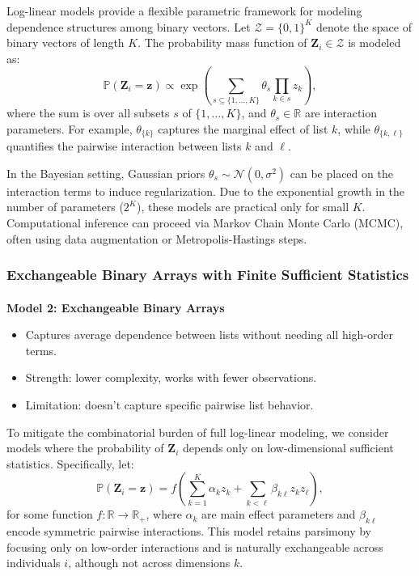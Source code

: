 \documentclass[
  12pt,
]{article}
\makeatletter
\let\oldparagraph\paragraph
\renewcommand{\paragraph}{
    \@ifstar
      \xxxParagraphStar
      \xxxParagraphNoStar
  }
\newcommand{\xxxParagraphStar}[1]{\oldparagraph*{#1}\mbox{}}
\newcommand{\xxxParagraphNoStar}[1]{\oldparagraph{#1}\mbox{}}
\providecommand{\tightlist}{%
  \setlength{\itemsep}{0pt}\setlength{\parskip}{0pt}}\usepackage{longtable,booktabs,array}
\theoremstyle{plain}
\theoremstyle{definition}
\makeatother
\begin{document}
Log-linear models provide a flexible parametric framework for modeling
dependence structures among binary vectors. Let
\(\mathcal{Z} = \{0,1\}^K\) denote the space of binary vectors of length
\(K\). The probability mass function of \(\mathbf{Z}_i \in \mathcal{Z}\)
is modeled as: \[
\mathbb{P}(\mathbf{Z}_i = \mathbf{z}) \propto \exp\left( \sum_{s \subseteq \{1, \ldots, K\}} \theta_s \prod_{k \in s} z_k \right),
\] where the sum is over all subsets \(s\) of \(\{1, \ldots, K\}\), and
\(\theta_s \in \mathbb{R}\) are interaction parameters. For example,
\(\theta_{\{k\}}\) captures the marginal effect of list \(k\), while
\(\theta_{\{k,\ell\}}\) quantifies the pairwise interaction between
lists \(k\) and \(\ell\).

In the Bayesian setting, Gaussian priors
\(\theta_s \sim \mathcal{N}(0, \sigma^2)\) can be placed on the
interaction terms to induce regularization. Due to the exponential
growth in the number of parameters (\(2^K\)), these models are practical
only for small \(K\). Computational inference can proceed via Markov
Chain Monte Carlo (MCMC), often using data augmentation or
Metropolis-Hastings steps.

\subsubsection{Exchangeable Binary Arrays with Finite Sufficient
Statistics}\label{exchangeable-binary-arrays-with-finite-sufficient-statistics}

\paragraph{\texorpdfstring{\textbf{Model 2: Exchangeable Binary
Arrays}}{Model 2: Exchangeable Binary Arrays}}\label{model-2-exchangeable-binary-arrays}

\begin{itemize}
\tightlist
\item
  Captures average dependence between lists without needing all
  high-order terms.
\item
  Strength: lower complexity, works with fewer observations.
\item
  Limitation: doesn't capture specific pairwise list behavior.
\end{itemize}

To mitigate the combinatorial burden of full log-linear modeling, we
consider models where the probability of \(\mathbf{Z}_i\) depends only
on low-dimensional sufficient statistics. Specifically, let: \[
\mathbb{P}(\mathbf{Z}_i = \mathbf{z}) = f\left( \sum_{k=1}^K \alpha_k z_k + \sum_{k<\ell} \beta_{k\ell} z_k z_\ell \right),
\] for some function \(f: \mathbb{R} \rightarrow \mathbb{R}_+\), where
\(\alpha_k\) are main effect parameters and \(\beta_{k\ell}\) encode
symmetric pairwise interactions. This model retains parsimony by
focusing only on low-order interactions and is naturally exchangeable
across individuals \(i\), although not across dimensions \(k\).
\end{document}

